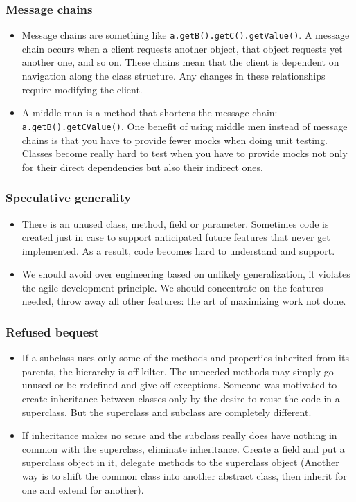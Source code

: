 \documentclass{article}
\begin{document}
\subsubsection{Message chains}
\begin{itemize}
    \item Message chains are something like \lstinline{a.getB().getC().getValue()}. A message chain occurs when a client requests another object, that object requests yet another one, and so on. These chains mean that the client is dependent on navigation along the class structure. Any changes in these relationships require modifying the client.
    \item A middle man is a method that shortens the message chain: \lstinline{a.getB().getCValue()}. One benefit of using middle men instead of message chains is that you have to provide fewer mocks when doing unit testing. Classes become really hard to test when you have to provide mocks not only for their direct dependencies but also their indirect ones.
\end{itemize}

\subsubsection{Speculative generality}
\begin{itemize}
    \item There is an unused class, method, field or parameter. Sometimes code is created just in case to support anticipated future features that never get implemented. As a result, code becomes hard to understand and support. 
    \item We should avoid over engineering based on unlikely generalization, it violates the agile development principle. We should concentrate on the features needed, throw away all other features: the art of maximizing work not done.
\end{itemize}

\subsubsection{Refused bequest}
\begin{itemize}
    \item If a subclass uses only some of the methods and properties inherited from its parents, the hierarchy is off-kilter. The unneeded methods may simply go unused or be redefined and give off exceptions. Someone was motivated to create inheritance between classes only by the desire to reuse the code in a superclass. But the superclass and subclass are completely different.
    \item If inheritance makes no sense and the subclass really does have nothing in common with the superclass, eliminate inheritance. Create a field and put a superclass object in it, delegate methods to the superclass object (Another way is to shift the common class into another abstract class, then inherit for one and extend for another).
\end{itemize}
\end{document}
